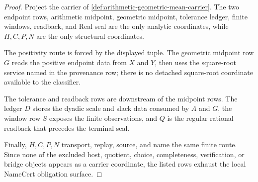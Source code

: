 \begin{proof}
Project the carrier of \autoref{def:arithmetic-geometric-mean-carrier}. The two endpoint rows, arithmetic midpoint, geometric midpoint, tolerance ledger, finite windows, readback, and Real seal are the only analytic coordinates, while $H,C,P,N$ are the only structural coordinates.

The positivity route is forced by the displayed tuple. The geometric midpoint row $G$ reads the positive endpoint data from $X$ and $Y$, then uses the square-root service named in the provenance row; there is no detached square-root coordinate available to the classifier.

The tolerance and readback rows are downstream of the midpoint rows. The ledger $D$ stores the dyadic scale and slack data consumed by $A$ and $G$, the window row $S$ exposes the finite observations, and $Q$ is the regular rational readback that precedes the terminal seal.

Finally, $H,C,P,N$ transport, replay, source, and name the same finite route. Since none of the excluded host, quotient, choice, completeness, verification, or bridge objects appears as a carrier coordinate, the listed rows exhaust the local NameCert obligation surface.
\end{proof}

